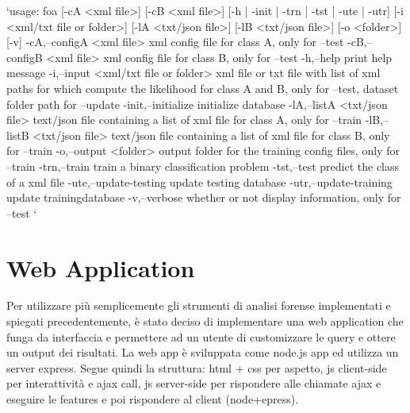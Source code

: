 `usage: foa [-cA <xml file>] [-cB <xml file>] [-h | -init | -trn | -tst |
       -ute | -utr] [-i <xml/txt file or folder>]  [-lA <txt/json file>]
       [-lB <txt/json file>] [-o <folder>]     [-v]
 -cA,--configA <xml file>              xml config file for class A, only
                                       for --test
 -cB,--configB <xml file>              xml config file for class B, only
                                       for --test
 -h,--help                             print help message
 -i,--input <xml/txt file or folder>   xml file or txt file with list of
                                       xml paths for which compute the
                                       likelihood for class A and B, only
                                       for --test, dataset folder path for
                                       --update
 -init,--initialize                    initialize database
 -lA,--listA <txt/json file>           text/json file containing a list of
                                       xml file for class A, only for
                                       --train
 -lB,--listB <txt/json file>           text/json file containing a list of
                                       xml file for class B, only for
                                       --train
 -o,--output <folder>                  output folder for the training
                                       config files, only for --train
 -trn,--train                          train a binary classification
                                       problem
 -tst,--test                           predict the class of a xml file
 -ute,--update-testing                 update testing database
 -utr,--update-training                update trainingdatabase
 -v,--verbose                          whether or not display information,
                                       only for --test
`

\section{Web Application}

Per utilizzare più semplicemente gli strumenti di analisi forense implementati e spiegati precedentemente, è stato deciso di implementare una web application che funga da interfaccia e permettere ad un utente di customizzare le query e ottere un output dei risultati.
La web app è sviluppata come node.js app ed utilizza un server express. Segue quindi la struttura: html + css per aspetto, js client-side per interattività e ajax call, js server-side per rispondere alle chiamate ajax e eseguire le features e poi rispondere al client (node+epress).

